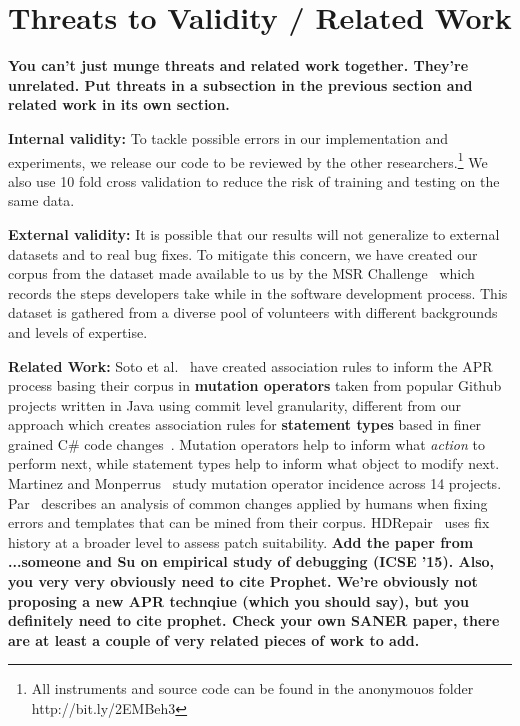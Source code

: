 \documentclass[sigconf]{acmart}
\newcommand{\todo}[1]
  {{\scriptsize \textbf{\color{red} {#1}}}}
\begin{document}
\section{Threats to Validity / Related Work} \label{threatsVal}

\todo{You can't just munge threats and related work together.  They're unrelated.  Put threats in a
  subsection in the previous section and related work in its own section.}

\noindent\textbf{Internal validity:}
To tackle possible errors in our implementation and experiments, we release our code
to be reviewed by the other researchers.\footnote{All instruments
and source code can be found in the anonymouos folder 
http://bit.ly/2EMBeh3} 
We also use 10 fold cross validation 
to reduce the risk of training and testing on the same data.  

\noindent\textbf{External validity:} 
It is possible 
that our results will not generalize to external datasets and to
real bug fixes. To mitigate this concern, we have created our corpus 
from the dataset made available to us by the MSR Challenge~\cite{msr18challenge}
which records the steps developers take while in the software development process.
This dataset is gathered from a diverse pool of volunteers with different 
backgrounds and levels of expertise.

\noindent\textbf{Related Work:} 
Soto et al.~\cite{Soto18} have created association rules to inform the APR
process basing their corpus in \textbf{mutation operators} taken from popular Github projects
written in Java using commit level granularity, 
different from our approach which creates association rules for \textbf{statement types} 
based in finer grained C\# code changes~\cite{msr18challenge}. Mutation operators help to 
inform what \textit{action} to perform next, while statement types help to inform what
object to modify next. 
Martinez and
Monperrus~\cite{martinez15} study mutation operator incidence across 
14 projects. Par~\cite{kim2013} describes an analysis of common changes
applied by humans when fixing errors and templates that can be mined from
their corpus. HDRepair~\cite{xuan16} 
uses fix history at a broader level
to assess patch suitability.
\todo{Add the paper from ...someone and Su on empirical study of debugging (ICSE
  '15).  Also, you very very obviously need to cite Prophet.  We're obviously
  not proposing a new APR technqiue (which you should say), but you definitely
  need to cite prophet.  Check your own SANER paper, there are at least a couple
of very related pieces of work to add.}
\end{document}
